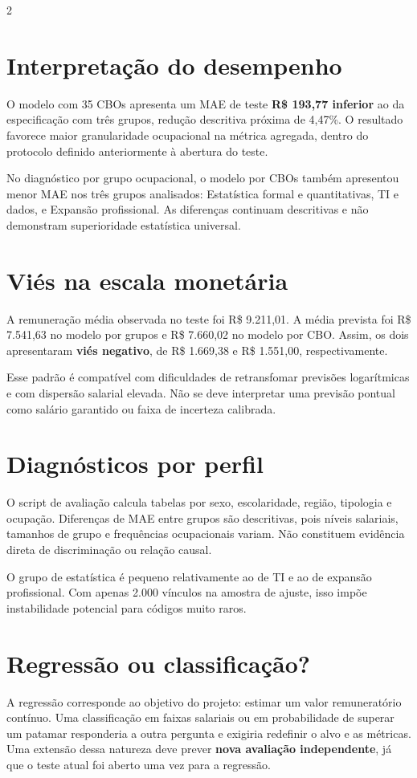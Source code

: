 \documentclass[10pt,a4paper]{article}
\begin{document}
\begin{multicols}{2}\raggedcolumns
\section{Interpretação do desempenho}
O modelo com 35 CBOs apresenta um MAE de teste \textbf{R\$ 193,77 inferior} ao da especificação com três grupos, redução descritiva próxima de 4,47\%. O resultado favorece maior granularidade ocupacional na métrica agregada, dentro do protocolo definido anteriormente à abertura do teste.

No diagnóstico por grupo ocupacional, o modelo por CBOs também apresentou menor MAE nos três grupos analisados: Estatística formal e quantitativas, TI e dados, e Expansão profissional. As diferenças continuam descritivas e não demonstram superioridade estatística universal.

\section{Viés na escala monetária}
A remuneração média observada no teste foi R\$ 9.211,01. A média prevista foi R\$ 7.541,63 no modelo por grupos e R\$ 7.660,02 no modelo por CBO. Assim, os dois apresentaram \textbf{viés negativo}, de R\$ 1.669,38 e R\$ 1.551,00, respectivamente.

Esse padrão é compatível com dificuldades de retransfomar previsões logarítmicas e com dispersão salarial elevada. Não se deve interpretar uma previsão pontual como salário garantido ou faixa de incerteza calibrada.

\section{Diagnósticos por perfil}
O script de avaliação calcula tabelas por sexo, escolaridade, região, tipologia e ocupação. Diferenças de MAE entre grupos são descritivas, pois níveis salariais, tamanhos de grupo e frequências ocupacionais variam. Não constituem evidência direta de discriminação ou relação causal.

O grupo de estatística é pequeno relativamente ao de TI e ao de expansão profissional. Com apenas 2.000 vínculos na amostra de ajuste, isso impõe instabilidade potencial para códigos muito raros.

\section{Regressão ou classificação?}
A regressão corresponde ao objetivo do projeto: estimar um valor remuneratório contínuo. Uma classificação em faixas salariais ou em probabilidade de superar um patamar responderia a outra pergunta e exigiria redefinir o alvo e as métricas. Uma extensão dessa natureza deve prever \textbf{nova avaliação independente}, já que o teste atual foi aberto uma vez para a regressão.
\end{multicols}
\end{document}
